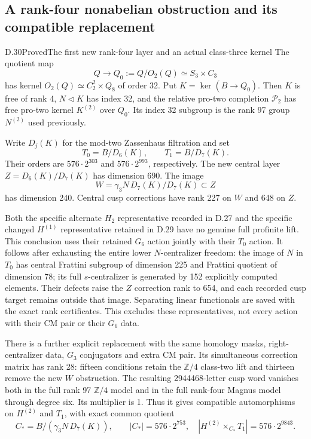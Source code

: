 \subsection{A rank-four nonabelian obstruction and its compatible replacement}

\begin{statement}{D.30}{Proved}{The first new rank-four layer and an actual class-three kernel}
The quotient map
\[
 Q\longrightarrow Q_0:=Q/O_2(Q)
       \simeq S_3\times C_3                              \tag{D.30.1}
\]
has kernel $O_2(Q)\simeq C_2^2\times Q_8$ of order 32.
Put $K=\ker(B\to Q_0)$. Then $K$ is free of rank 4,
$N\triangleleft K$ has index 32, and the relative pro-two
completion $\mathcal P_2$ has free pro-two kernel $K^{(2)}$
over $Q_0$. Its index 32 subgroup is the rank 97 group
$N^{(2)}$ used previously.

Write $D_j(K)$ for the mod-two Zassenhaus filtration and set
\[
 T_0=B/D_6(K),\qquad T_1=B/D_7(K).
                                                               \tag{D.30.2}
\]
Their orders are $576\cdot2^{303}$ and
$576\cdot2^{993}$, respectively. The new central layer
$Z=D_6(K)/D_7(K)$ has dimension 690. The image
\[
 W=\gamma_3N\,D_7(K)/D_7(K)\subset Z                  \tag{D.30.3}
\]
has dimension 240. Central cusp corrections have rank 227
on $W$ and 648 on $Z$.

Both the specific alternate $H_2$ representative recorded
in D.27 and the specific changed $H^{(1)}$ representative
retained in D.29 have no genuine full profinite lift.
This conclusion uses their retained $G_6$ action jointly
with their $T_0$ action. It follows after exhausting the
entire lower $N$-centralizer freedom: the image of $N$ in
$T_0$ has central Frattini subgroup of dimension 225 and
Frattini quotient of dimension 78; its full $s$-centralizer
is generated by 152 explicitly computed elements. Their
defects raise the $Z$ correction rank to 654, and each
recorded cusp target remains outside that image.
Separating linear functionals are saved with the exact
rank certificates. This excludes these representatives,
not every action with their CM pair or their $G_6$ data.

There is a further explicit replacement with the same
homology masks, right-centralizer data, $G_3$ conjugators
and extra CM pair. Its simultaneous correction matrix
has rank 28: fifteen conditions retain the $\mathbb Z/4$
class-two lift and thirteen remove the new $W$ obstruction.
The resulting 2944468-letter cusp word vanishes both in
the full rank 97 $\mathbb Z/4$ model and in the full
rank-four Magnus model through degree six. Its multiplier
is 1. Thus it gives compatible automorphisms on
$H^{(2)}$ and $T_1$, with exact common quotient
\[
 C_*=B/(\gamma_3N\,D_7(K)),\qquad
 |C_*|=576\cdot2^{753},
 \quad |H^{(2)}\times_{C_*}T_1|=576\cdot2^{9843}.
                                                               \tag{D.30.4}
\]


\end{statement}
